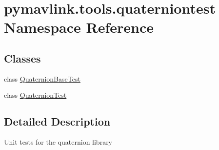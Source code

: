 \hypertarget{namespacepymavlink_1_1tools_1_1quaterniontest}{}\section{pymavlink.\+tools.\+quaterniontest Namespace Reference}
\label{namespacepymavlink_1_1tools_1_1quaterniontest}
\subsection*{Classes}
\begin{DoxyCompactItemize}
\item 
class \hyperlink{classpymavlink_1_1tools_1_1quaterniontest_1_1QuaternionBaseTest}{Quaternion\+Base\+Test}
\item 
class \hyperlink{classpymavlink_1_1tools_1_1quaterniontest_1_1QuaternionTest}{Quaternion\+Test}
\end{DoxyCompactItemize}


\subsection{Detailed Description}
\begin{DoxyVerb}Unit tests for the quaternion library
\end{DoxyVerb}
 